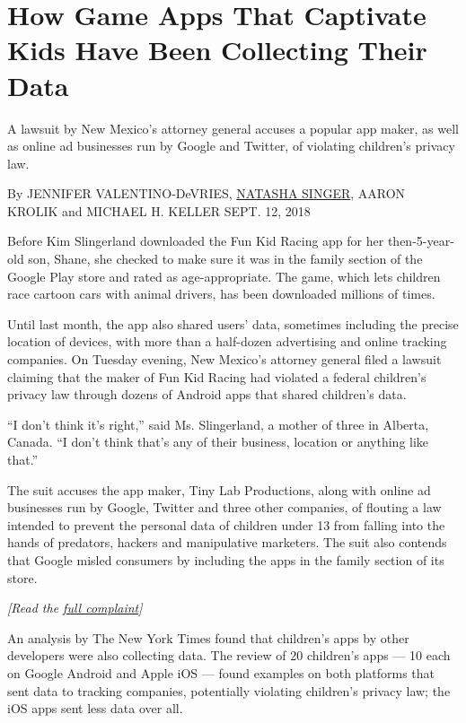 \hypertarget{how-game-apps-that-captivate-kids-have-been-collecting-their-data-1}{%
\section{How Game Apps That Captivate Kids Have Been Collecting Their
Data}\label{how-game-apps-that-captivate-kids-have-been-collecting-their-data-1}}

A lawsuit by New Mexico's attorney general accuses a popular app maker,
as well as online ad businesses run by Google and Twitter, of violating
children's privacy law.

By JENNIFER VALENTINO-DeVRIES,
\href{http://www.nytimes.com/by/natasha-singer}{NATASHA SINGER}, AARON
KROLIK and MICHAEL H. KELLER SEPT. 12, 2018

Before Kim Slingerland downloaded the Fun Kid Racing app for her
then-5-year-old son, Shane, she checked to make sure it was in the
family section of the Google Play store and rated as age-appropriate.
The game, which lets children race cartoon cars with animal drivers, has
been downloaded millions of times.

Until last month, the app also shared users' data, sometimes including
the precise location of devices, with more than a half-dozen advertising
and online tracking companies. On Tuesday evening, New Mexico's attorney
general filed a lawsuit claiming that the maker of Fun Kid Racing had
violated a federal children's privacy law through dozens of Android apps
that shared children's data.

``I don't think it's right,'' said Ms. Slingerland, a mother of three in
Alberta, Canada. ``I don't think that's any of their business, location
or anything like that.''

The suit accuses the app maker, Tiny Lab Productions, along with online
ad businesses run by Google, Twitter and three other companies, of
flouting a law intended to prevent the personal data of children under
13 from falling into the hands of predators, hackers and manipulative
marketers. The suit also contends that Google misled consumers by
including the apps in the family section of its store.

\emph{{[}Read the
\href{https://int.nyt.com/data/documenthelper/295-new-mexico-kid-apps-complaint/206d4ea39896e264fe3a/optimized/full.pdf\#page=1?action=click\&module=Intentional\&pgtype=Article}{full
complaint}{]}}

An analysis by The New York Times found that children's apps by other
developers were also collecting data. The review of 20 children's apps
--- 10 each on Google Android and Apple iOS --- found examples on both
platforms that sent data to tracking companies, potentially violating
children's privacy law; the iOS apps sent less data over all.

